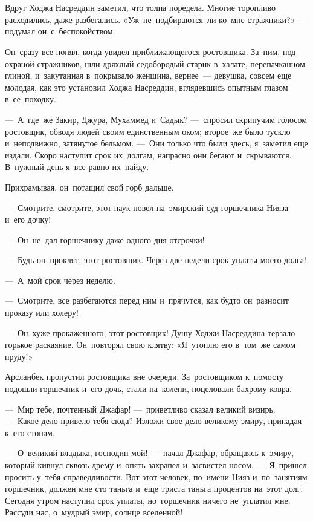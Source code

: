 \documentclass[12pt,a4paper]{book}
\begin{document}
\chapter{}

Вдруг Ходжа Насреддин заметил, что толпа поредела. Многие торопливо расходились, даже разбегались. «Уж~не~подбираются~ли ко~мне стражники?»~— подумал он~с~беспокойством.

Он~сразу все понял, когда увидел приближающегося ростовщика. За~ним, под охраной стражников, шли дряхлый седобородый старик в~халате, перепачканном глиной, и~закутанная в~покрывало женщина, вернее~— девушка, совсем еще молодая, как это установил Ходжа Насреддин, вглядевшись опытным глазом в~ее~походку.

—~А~где~же Закир, Джура, Мухаммед и~Садык? —~спросил скрипучим голосом ростовщик, обводя людей своим единственным оком; второе~же было тускло и~неподвижно, затянутое бельмом. —~Они только что были здесь, я~заметил еще издали. Скоро наступит срок их~долгам, напрасно они бегают и~скрываются. В~нужный день я~все равно их~найду.

Прихрамывая, он~потащил свой горб дальше.

—~Смотрите, смотрите, этот паук повел на~эмирский суд горшечника Нияза и~его дочку!

—~Он~не~дал горшечнику даже одного дня отсрочки!

—~Будь он~проклят, этот ростовщик. Через две недели срок уплаты моего долга!

—~А~мой срок через неделю.

—~Смотрите, все разбегаются перед ним и~прячутся, как будто он~разносит проказу или холеру!

—~Он~хуже прокаженного, этот ростовщик! Душу Ходжи Насреддина терзало горькое раскаяние. Он~повторял свою клятву: «Я~утоплю его в~том~же самом пруду!»

Арсланбек пропустил ростовщика вне очереди. За~ростовщиком к~помосту подошли горшечник и~его дочь, стали на~колени, поцеловали бахрому ковра.

—~Мир тебе, почтенный Джафар! —~приветливо сказал великий визирь. —~Какое дело привело тебя сюда? Изложи свое дело великому эмиру, припадая к~его стопам.

—~О~великий владыка, господин мой! —~начал Джафар, обращаясь к~эмиру, который кивнул сквозь дрему и~опять захрапел и~засвистел носом. —~Я~пришел просить у~тебя справедливости. Вот этот человек, по~имени Нияз и~по~занятиям горшечник, должен мне сто таньга и~еще триста таньга процентов на~этот долг. Сегодня утром наступил срок уплаты, но~горшечник ничего не~уплатил мне. Рассуди нас, о~мудрый эмир, солнце вселенной!
\end{document}

